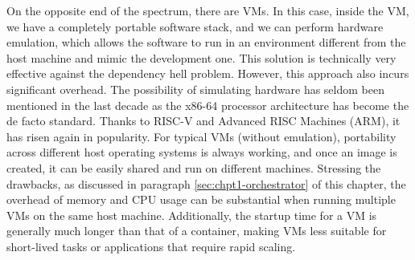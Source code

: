 
On the opposite end of the spectrum, there are VMs. In this case, inside the VM,
we have a completely portable software stack, and we can perform hardware
emulation, which allows the software to run in an environment different from the
host machine and mimic the development one. This solution is technically very
effective against the dependency hell problem. However, this approach also
incurs significant overhead. The possibility of simulating hardware has seldom
been mentioned in the last decade as the x86-64 processor architecture has
become the de facto standard. Thanks to RISC-V and Advanced RISC Machines (ARM),
it has risen again in popularity. For typical VMs (without emulation),
portability across different host operating systems is always working, and once
an image is created, it can be easily shared and run on different machines.
Stressing the drawbacks, as discussed in paragraph \ref{sec:chpt1-orchestrator}
of this chapter, the overhead of memory and CPU usage can be substantial when
running multiple VMs on the same host machine. Additionally, the startup time
for a VM is generally much longer than that of a container, making VMs less
suitable for short-lived tasks or applications that require rapid scaling.

